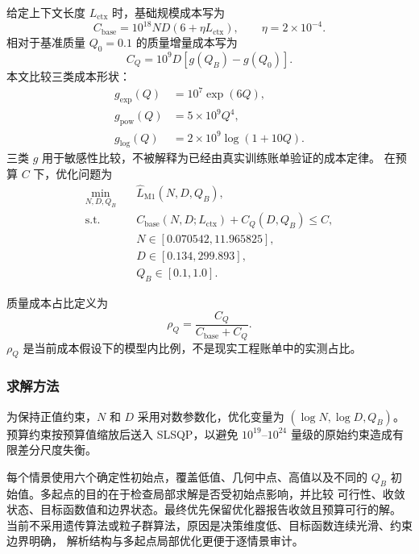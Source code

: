 给定上下文长度 $L_{\mathrm{ctx}}$ 时，基础规模成本写为
\begin{equation}
  C_{\mathrm{base}}
  =10^{18}ND\left(6+\eta L_{\mathrm{ctx}}\right),
  \qquad \eta=2\times10^{-4}.
  \label{eq:q3-sp2-base-cost}
\end{equation}
相对于基准质量 $Q_0=0.1$ 的质量增量成本写为
\begin{equation}
  C_Q=10^9D\left[g(Q_B)-g(Q_0)\right].
  \label{eq:q3-sp2-quality-cost}
\end{equation}
本文比较三类成本形状：
\begin{equation}
\begin{aligned}
g_{\mathrm{exp}}(Q)&=10^7\exp(6Q),\\
g_{\mathrm{pow}}(Q)&=5\times10^9Q^4,\\
g_{\mathrm{log}}(Q)&=2\times10^9\log(1+10Q).
\end{aligned}
\label{eq:q3-sp2-cost-families}
\end{equation}
三类 $g$ 用于敏感性比较，不被解释为已经由真实训练账单验证的成本定律。
在预算 $C$ 下，优化问题为
\begin{equation}
\begin{aligned}
\min_{N,D,Q_B}\quad&
\widehat L_{\mathrm{M1}}(N,D,Q_B),\\
\mathrm{s.t.}\quad&
C_{\mathrm{base}}(N,D;L_{\mathrm{ctx}})
+C_Q(D,Q_B)\le C,\\
&N\in[0.070542,11.965825],\\
&D\in[0.134,299.893],\\
&Q_B\in[0.1,1.0].
\end{aligned}
\label{eq:q3-sp2-opt}
\end{equation}

质量成本占比定义为
\begin{equation}
  \rho_Q=\frac{C_Q}{C_{\mathrm{base}}+C_Q}.
  \label{eq:q3-sp2-quality-share}
\end{equation}
$\rho_Q$ 是当前成本假设下的模型内比例，不是现实工程账单中的实测占比。

\subsubsection{求解方法}

为保持正值约束，$N$ 和 $D$ 采用对数参数化，优化变量为
$(\log N,\log D,Q_B)$。预算约束按预算值缩放后送入 SLSQP，以避免
$10^{19}$--$10^{24}$ 量级的原始约束造成有限差分尺度失衡。

每个情景使用六个确定性初始点，覆盖低值、几何中点、高值以及不同的
$Q_B$ 初始值。多起点的目的在于检查局部求解是否受初始点影响，并比较
可行性、收敛状态、目标函数值和边界状态。最终优先保留优化器报告收敛且预算可行的解。
当前不采用遗传算法或粒子群算法，原因是决策维度低、目标函数连续光滑、约束边界明确，
解析结构与多起点局部优化更便于逐情景审计。

